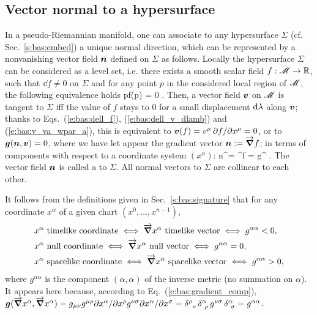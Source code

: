 \subsection{Vector normal to a hypersurface} \label{s:bas:hyp_normal}

In a pseudo-Riemannian manifold, one can associate to any hypersurface
$\Sigma$ (cf. Sec.~\ref{s:bas:embed}) a unique normal direction, which can
be represented by a nonvanishing vector field $\bm{n}$ defined on $\Sigma$ as follows.
Locally the hypersurface $\Sigma$ can be considered as a level set, i.e.
there exists a smooth scalar field $f:\mathscr{M} \rightarrow \mathbb{R}$, such that
$\dd f \neq 0$ on $\Sigma$ and
for any point $p$ in the considered local region of $\mathscr{M}$, the following equivalence
holds
\be
    p\in \Sigma \iff f(p) = 0 .
\ee
Then, a vector field $\bm{v}$ on $\mathscr{M}$ is tangent to $\Sigma$ iff
the value of $f$ stays to $0$ for a small displacement
$\mathrm{d}\lambda$ along $\bm{v}$; thanks to Eqs.~(\ref{e:bas:dell_f}),
(\ref{e:bas:dell_v_dlamb}) and (\ref{e:bas:v_va_wpar_a}), this is equivalent to
$\bm{v}(f) = v^\mu\,  {\partial f}/{\partial x^\mu} = 0$,
or to $\bm{g}(\bm{n},\bm{v}) = 0$,
where we have let appear the gradient vector $\bm{n} := \overrightarrow{\bm{\nabla}} f$; in
terms of components with respect to a coordinate system $(x^\alpha)$:
\be \label{e:bas:gradient_comp}
    n^\alpha = \nabla^\alpha f = g^{\alpha\mu}  .
\ee
The vector field $\bm{n}$ is called a 
to $\Sigma$. All normal vectors to $\Sigma$ are collinear to each other.

It follows from the definitions given in Sec.~\ref{s:bas:signature} that
for any coordinate $x^\alpha$ of a given chart $(x^0,\ldots,x^{n-1})$,
\begin{subequations}
\label{e:bas:char_causal_type_coord}
\begin{align}
& x^\alpha \ \mbox{timelike coordinate}  \iff \vw{\nabla} x^\alpha \ \mbox{timelike vector}
  \iff g^{\alpha\alpha} < 0 ,  \\
& x^\alpha \ \mbox{null coordinate}  \iff \vw{\nabla} x^\alpha \ \mbox{null vector}
  \iff g^{\alpha\alpha} = 0  , \label{e:bas:char_null_coord} \\
& x^\alpha \ \mbox{spacelike coordinate}  \iff \vw{\nabla} x^\alpha \ \mbox{spacelike vector}
  \iff g^{\alpha\alpha} > 0 , \label{e:bas:char_spacelike_coord}
\end{align}
\end{subequations}
where $g^{\alpha\alpha}$ is the component $(\alpha,\alpha)$ of the inverse metric
(no summation on $\alpha$). It appears here because, according to Eq.~(\ref{e:bas:gradient_comp}),
$\bm{g}(\overrightarrow{\bm{\nabla}} x^\alpha , \overrightarrow{\bm{\nabla}} x^\alpha ) = g_{\mu\nu} g^{\mu\rho} {\partial x^\alpha}/{\partial x^\rho}
 g^{\nu\sigma} {\partial x^\alpha}/{\partial x^\sigma} = \delta^\rho_{\ \, \nu} \, \delta^\alpha_{\ \rho} \, g^{\nu\sigma}\,
 \delta^\alpha_{\ \sigma} = g^{\alpha\alpha}$.

